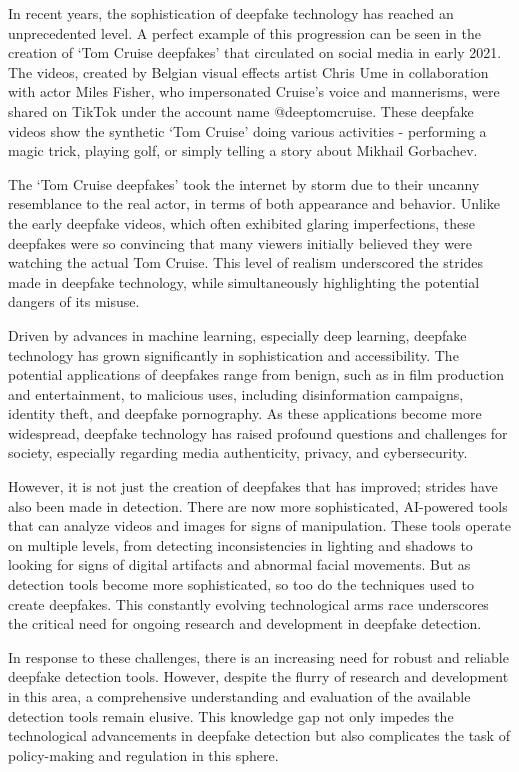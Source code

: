 In recent years, the sophistication of deepfake technology has reached an unprecedented level. 
A perfect example of this progression can be seen in the creation of `Tom Cruise deepfakes' 
that circulated on social media in early 2021. The videos, created by Belgian visual effects 
artist Chris Ume in collaboration with actor Miles Fisher, who impersonated Cruise's voice 
and mannerisms, were shared on TikTok under the account name @deeptomcruise. These deepfake 
videos show the synthetic `Tom Cruise' doing various activities - performing a magic trick, 
playing golf, or simply telling a story about Mikhail Gorbachev.

The `Tom Cruise deepfakes' took the internet by storm due to their uncanny resemblance to the 
real actor, in terms of both appearance and behavior. Unlike the early deepfake videos, which 
often exhibited glaring imperfections, these deepfakes were so convincing that many viewers 
initially believed they were watching the actual Tom Cruise. This level of realism underscored 
the strides made in deepfake technology, while simultaneously highlighting the potential 
dangers of its misuse.

Driven by advances in machine learning, especially deep learning, deepfake technology has
grown significantly in sophistication and accessibility. The potential applications of
deepfakes range from benign, such as in film production and entertainment, to malicious uses,
including disinformation campaigns, identity theft, and deepfake pornography. As these
applications become more widespread, deepfake technology has raised profound questions and
challenges for society, especially regarding media authenticity, privacy, and cybersecurity.

However, it is not just the creation of deepfakes that has improved; strides have also been made 
in detection. There are now more sophisticated, \ac{AI}-powered tools that can analyze videos and 
images for signs of manipulation. These tools operate on multiple levels, from detecting 
inconsistencies in lighting and shadows to looking for signs of digital artifacts and abnormal 
facial movements. But as detection tools become more sophisticated, so too do the techniques 
used to create deepfakes. This constantly evolving technological arms race underscores the 
critical need for ongoing research and development in deepfake detection.

In response to these challenges, there is an increasing need for robust and reliable
deepfake detection tools. However, despite the flurry of research and development in this
area, a comprehensive understanding and evaluation of the available detection tools remain
elusive. This knowledge gap not only impedes the technological advancements in deepfake
detection but also complicates the task of policy-making and regulation in this sphere.


